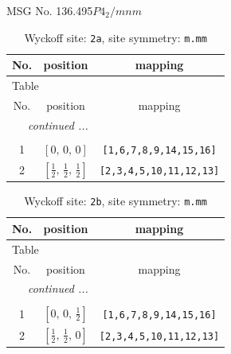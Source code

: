 \documentclass[fleqn,8pt]{jsarticle}
\begin{document}
\setcounter{MaxMatrixCols}{32}

\renewcommand{\tablename}{Table~}
\renewcommand{\figurename}{Figure~}
\begin{center}
\LARGE
MSG No. 136.495\quad$P4_{2}/mnm$
\end{center}
\renewcommand{\arraystretch}{1.2}
\begin{longtable}{ccc}
\caption{Wyckoff site: {\tt 2a}, site symmetry: {\tt m.mm}}
 \\
 \hline \hline
No. & position & mapping \\ \hline \endfirsthead

\multicolumn{2}{l}{\tablename\ \thetable{}} \\
 \hline \hline
No. & position & mapping \\ \hline \endhead

 \hline \hline
\multicolumn{2}{r}{\footnotesize\it continued ...} \\ \endfoot

 \hline \hline
\multicolumn{2}{r}{} \\ \endlastfoot

1 & $\left[ 0,\, 0,\, 0 \right]$ & {\tt [1,6,7,8,9,14,15,16]} \\ \hline
2 & $\left[ \frac{1}{2},\, \frac{1}{2},\, \frac{1}{2} \right]$ & {\tt [2,3,4,5,10,11,12,13]} \\
\end{longtable}
\renewcommand{\arraystretch}{1.2}
\begin{longtable}{ccc}
\caption{Wyckoff site: {\tt 2b}, site symmetry: {\tt m.mm}}
 \\
 \hline \hline
No. & position & mapping \\ \hline \endfirsthead

\multicolumn{2}{l}{\tablename\ \thetable{}} \\
 \hline \hline
No. & position & mapping \\ \hline \endhead

 \hline \hline
\multicolumn{2}{r}{\footnotesize\it continued ...} \\ \endfoot

 \hline \hline
\multicolumn{2}{r}{} \\ \endlastfoot

1 & $\left[ 0,\, 0,\, \frac{1}{2} \right]$ & {\tt [1,6,7,8,9,14,15,16]} \\ \hline
2 & $\left[ \frac{1}{2},\, \frac{1}{2},\, 0 \right]$ & {\tt [2,3,4,5,10,11,12,13]} \\
\end{longtable}
\end{document}
